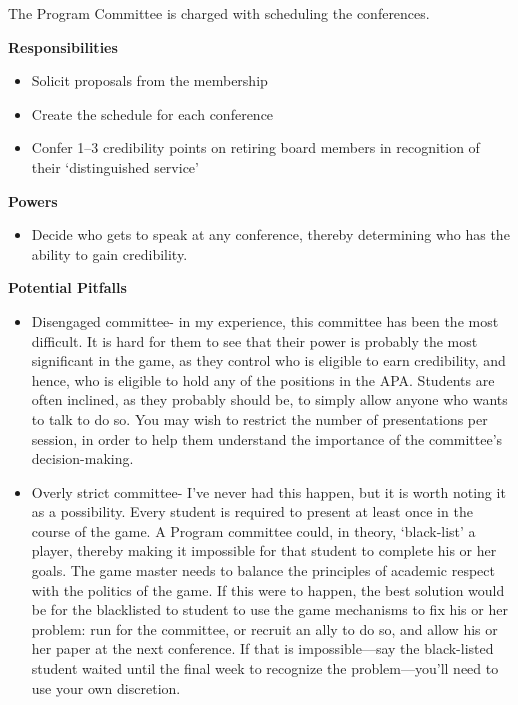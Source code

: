 \begin{refsection}
The Program Committee is charged with scheduling the conferences. 

\textbf{Responsibilities}

\begin{itemize}
\item Solicit proposals from the membership

\item Create the schedule for each conference

\item Confer 1--3 credibility points on retiring board members in recognition of their ‘distinguished service’

\end{itemize}

\textbf{Powers}

\begin{itemize}
\item Decide who gets to speak at any conference, thereby determining who has the ability to gain credibility.

\end{itemize}

\textbf{Potential Pitfalls}

\begin{itemize}
\item Disengaged committee- in my experience, this committee has been the most difficult. It is hard for them to see that their power is probably the most significant in the game, as they control who is eligible to earn credibility, and hence, who is eligible to hold any of the positions in the APA. Students are often inclined, as they probably should be, to simply allow anyone who wants to talk to do so. You may wish to restrict the number of presentations per session, in order to help them understand the importance of the committee’s decision-making.

\item Overly strict committee- I’ve never had this happen, but it is worth noting it as a possibility. Every student is required to present at least once in the course of the game. A Program committee could, in theory, ‘black-list’ a player, thereby making it impossible for that student to complete his or her goals. The game master needs to balance the principles of academic respect with the politics of the game. If this were to happen, the best solution would be for the blacklisted to student to use the game mechanisms to fix his or her problem: run for the committee, or recruit an ally to do so, and allow his or her paper at the next conference. If that is impossible---say the black-listed student waited until the final week to recognize the problem---you’ll need to use your own discretion.


\end{itemize}
\end{refsection}
